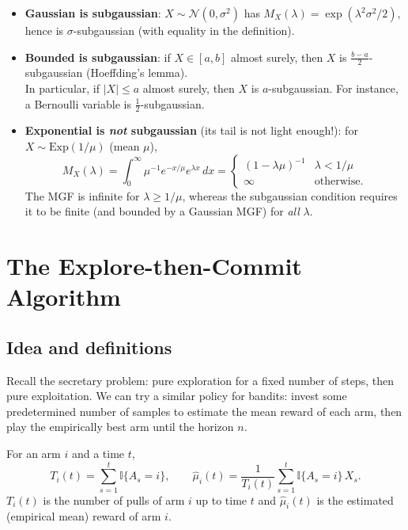 \begin{itemize}
    \item \textbf{Gaussian is subgaussian}: $X \sim \mathcal{N}(0,\sigma^2)$ has $M_X(\lambda) = \exp(\lambda^2\sigma^2/2)$, hence is $\sigma$-subgaussian (with equality in the definition).
    \item \textbf{Bounded is subgaussian}: if $X \in [a,b]$ almost surely, then $X$ is $\frac{b-a}{2}$-subgaussian (Hoeffding's lemma). \\ In particular, if $|X| \leq a$ almost surely, then $X$ is $a$-subgaussian. For instance, a Bernoulli variable is $\frac{1}{2}$-subgaussian.
    \item \textbf{Exponential is \emph{not} subgaussian} (its tail is not light enough!): for $X \sim \mathrm{Exp}(1/\mu)$ (mean $\mu$),
    \[
    M_X(\lambda) = \int_0^\infty \mu^{-1} e^{-x/\mu} e^{\lambda x}\, dx = \begin{cases} (1 - \lambda\mu)^{-1} & \lambda < 1/\mu \\ \infty & \text{otherwise.} \end{cases}
    \]
    The MGF is infinite for $\lambda \geq 1/\mu$, whereas the subgaussian condition requires it to be finite (and bounded by a Gaussian MGF) for \emph{all} $\lambda$.
\end{itemize}

\section{The Explore-then-Commit Algorithm}

\subsection{Idea and definitions}

Recall the secretary problem: pure exploration for a fixed number of steps, then pure exploitation. We can try a similar policy for bandits: invest some predetermined number of samples to estimate the mean reward of each arm, then play the empirically best arm until the horizon $n$.

\begin{definition}
For an arm $i$ and a time $t$,
\[
T_i(t) = \sum_{s=1}^t \mathbb{I}\{A_s = i\}, \qquad \hat{\mu}_i(t) = \frac{1}{T_i(t)}\sum_{s=1}^t \mathbb{I}\{A_s = i\}\, X_s.
\]
$T_i(t)$ is the number of pulls of arm $i$ up to time $t$ and $\hat{\mu}_i(t)$ is the estimated (empirical mean) reward of arm $i$.
\end{definition}

